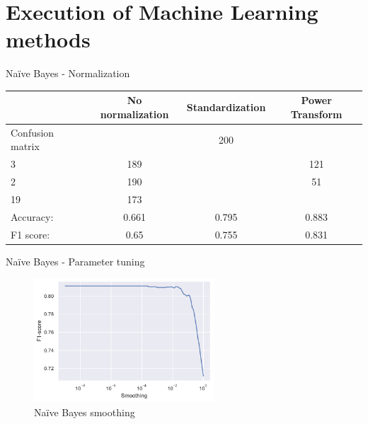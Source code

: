 \documentclass[aspectratio=169]{beamer}
\begin{document}
\section{Execution of Machine Learning methods}

\begin{frame}{Na\"ive Bayes - Normalization}
\begin{table}[H]
\centering
\begin{tabular}{lccc}
\toprule
    & No normalization & Standardization & Power Transform \\
    \midrule
    Confusion matrix & 
    \( \begin{bmatrix} 208 & 200 \\ 3 & 189 \end{bmatrix} \) & 
    \( \begin{bmatrix} 287 & 121 \\ 2 & 190\end{bmatrix} \) &
    \( \begin{bmatrix} 357 & 51 \\ 19 & 173\end{bmatrix} \)
    \\
    \addlinespace[0.5em]
    Accuracy: & 0.661 & 0.795 & 0.883 \\
    F1 score: & 0.65 & 0.755 & 0.831 \\
    \bottomrule
\end{tabular}
\end{table}
\end{frame}

\begin{frame}{Na\"ive Bayes - Parameter tuning}
\begin{figure}[H]
    \centering
    \includegraphics[width=0.6\textwidth]{naive_bayes_smoothing_cv.pdf}
    \caption{Na\"ive Bayes smoothing}%
    \label{fig:naive_bayes_smoothing_cv}
\end{figure}
\end{frame}
\end{document}
